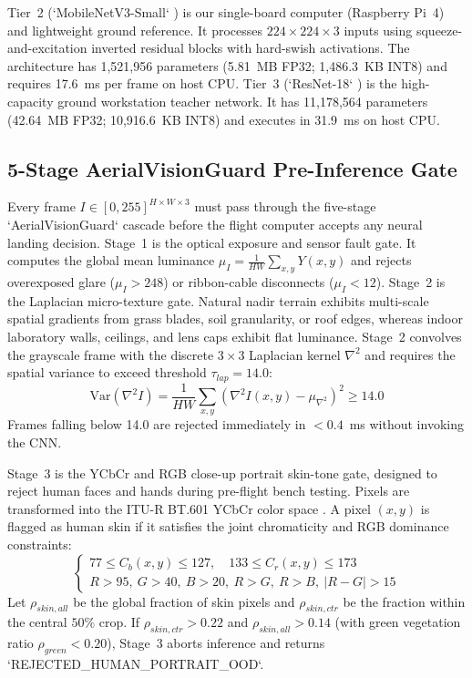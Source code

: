 \documentclass[conference]{IEEEtran}
\begin{document}
Tier~2 (`MobileNetV3-Small` \cite{howard_mobilenetv3}) is our single-board computer (Raspberry Pi~4) and lightweight ground reference. It processes $224 \times 224 \times 3$ inputs using squeeze-and-excitation inverted residual blocks with hard-swish activations. The architecture has 1,521,956 parameters (5.81~MB FP32; 1,486.3~KB INT8) and requires 17.6~ms per frame on host CPU. Tier~3 (`ResNet-18` \cite{he_resnet}) is the high-capacity ground workstation teacher network. It has 11,178,564 parameters (42.64~MB FP32; 10,916.6~KB INT8) and executes in 31.9~ms on host CPU.

\subsection{5-Stage AerialVisionGuard Pre-Inference Gate}
Every frame $I \in [0, 255]^{H \times W \times 3}$ must pass through the five-stage `AerialVisionGuard` cascade before the flight computer accepts any neural landing decision. Stage~1 is the optical exposure and sensor fault gate. It computes the global mean luminance $\mu_I = \frac{1}{HW}\sum_{x,y} Y(x,y)$ and rejects overexposed glare ($\mu_I > 248$) or ribbon-cable disconnects ($\mu_I < 12$). Stage~2 is the Laplacian micro-texture gate. Natural nadir terrain exhibits multi-scale spatial gradients from grass blades, soil granularity, or roof edges, whereas indoor laboratory walls, ceilings, and lens caps exhibit flat luminance. Stage~2 convolves the grayscale frame with the discrete $3 \times 3$ Laplacian kernel $\nabla^2$ and requires the spatial variance to exceed threshold $\tau_{lap} = 14.0$:
\begin{equation}
\text{Var}(\nabla^2 I) = \frac{1}{HW} \sum_{x,y} \left( \nabla^2 I(x,y) - \mu_{\nabla^2} \right)^2 \ge 14.0
\label{eq:laplacian_gate}
\end{equation}
Frames falling below 14.0 are rejected immediately in $<0.4$~ms without invoking the CNN.

Stage~3 is the YCbCr and RGB close-up portrait skin-tone gate, designed to reject human faces and hands during pre-flight bench testing. Pixels are transformed into the ITU-R BT.601 YCbCr color space \cite{chai_skin_ycbcr}. A pixel $(x,y)$ is flagged as human skin if it satisfies the joint chromaticity and RGB dominance constraints:
\begin{equation}
\begin{cases}
77 \le C_b(x,y) \le 127, \quad 133 \le C_r(x,y) \le 173 \\
R > 95, \ G > 40, \ B > 20, \ R > G, \ R > B, \ |R - G| > 15
\end{cases}
\label{eq:skin_gate}
\end{equation}
Let $\rho_{skin,all}$ be the global fraction of skin pixels and $\rho_{skin,ctr}$ be the fraction within the central $50\%$ crop. If $\rho_{skin,ctr} > 0.22$ and $\rho_{skin,all} > 0.14$ (with green vegetation ratio $\rho_{green} < 0.20$), Stage~3 aborts inference and returns `REJECTED_HUMAN_PORTRAIT_OOD`.
\end{document}
